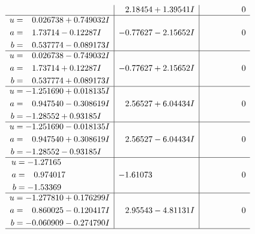 \documentclass[1p]{elsarticle_modified}
\theoremstyle{definition}
\begin{document}
$$\begin{array}{c|c|c}
 & \phantom{-}2.18454 + 1.39541 I & \phantom{-0.000000 } 0 \\ \hline\begin{aligned}
u &= \phantom{-}0.026738 + 0.749032 I \\
a &= \phantom{-}1.73714 - 0.12287 I \\
b &= \phantom{-}0.537774 - 0.089173 I\end{aligned}
 & -0.77627 - 2.15652 I & \phantom{-0.000000 } 0 \\ \hline\begin{aligned}
u &= \phantom{-}0.026738 - 0.749032 I \\
a &= \phantom{-}1.73714 + 0.12287 I \\
b &= \phantom{-}0.537774 + 0.089173 I\end{aligned}
 & -0.77627 + 2.15652 I & \phantom{-0.000000 } 0 \\ \hline\begin{aligned}
u &= -1.251690 + 0.018135 I \\
a &= \phantom{-}0.947540 - 0.308619 I \\
b &= -1.28552 + 0.93185 I\end{aligned}
 & \phantom{-}2.56527 + 6.04434 I & \phantom{-0.000000 } 0 \\ \hline\begin{aligned}
u &= -1.251690 - 0.018135 I \\
a &= \phantom{-}0.947540 + 0.308619 I \\
b &= -1.28552 - 0.93185 I\end{aligned}
 & \phantom{-}2.56527 - 6.04434 I & \phantom{-0.000000 } 0 \\ \hline\begin{aligned}
u &= -1.27165\phantom{ +0.000000I} \\
a &= \phantom{-}0.974017\phantom{ +0.000000I} \\
b &= -1.53369\phantom{ +0.000000I}\end{aligned}
 & -1.61073\phantom{ +0.000000I} & \phantom{-0.000000 } 0 \\ \hline\begin{aligned}
u &= -1.277810 + 0.176299 I \\
a &= \phantom{-}0.860025 - 0.120417 I \\
b &= -0.060909 - 0.274790 I\end{aligned}
 & \phantom{-}2.95543 - 4.81131 I & \phantom{-0.000000 } 0\\
 \hline 
 \end{array}$$\newpage$$\begin{array}{c|c|c}  

\end{array}$$
\end{document}
